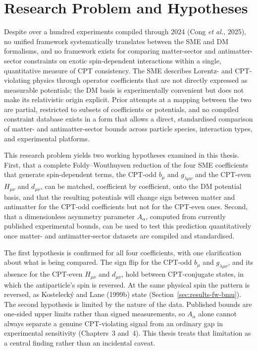 \section{Research Problem and Hypotheses}

Despite over a hundred experiments compiled through 2024 (Cong \textit{et
al.}, 2025), no unified framework systematically translates between the
SME and DM formalisms, and no framework exists for comparing matter-sector
and antimatter-sector constraints on exotic spin-dependent interactions
within a single, quantitative measure of CPT consistency. The SME describes
Lorentz- and CPT-violating physics through operator coefficients that are
not directly expressed as measurable potentials; the DM basis is
experimentally convenient but does not make its relativistic origin
explicit. Prior attempts at a mapping between the two are partial,
restricted to subsets of coefficients or potentials, and no compiled
constraint database exists in a form that allows a direct, standardised
comparison of matter- and antimatter-sector bounds across particle species,
interaction types, and experimental platforms.

This research problem yields two working hypotheses examined in this
thesis. First, that a complete Foldy--Wouthuysen reduction of the four SME
coefficients that generate spin-dependent terms, the CPT-odd $b_\mu$ and
$g_{\lambda\mu\nu}$ and the CPT-even $H_{\mu\nu}$ and $d_{\mu\nu}$, can be
matched, coefficient by coefficient, onto the DM potential basis, and that
the resulting potentials will change sign between matter and antimatter for
the CPT-odd coefficients but not for the CPT-even ones. Second, that a
dimensionless asymmetry parameter $A_\alpha$, computed from currently
published experimental bounds, can be used to test this prediction
quantitatively once matter- and antimatter-sector datasets are compiled
and standardised.

The first hypothesis is confirmed for all four coefficients, with one
clarification about what is being compared. The sign flip for the CPT-odd
$b_\mu$ and $g_{\lambda\mu\nu}$, and its absence for the CPT-even
$H_{\mu\nu}$ and $d_{\mu\nu}$, hold between CPT-conjugate states, in which
the antiparticle's spin is reversed. At the same physical spin the pattern
is reversed, as Kostelecký and Lane (1999b) state
(Section~\ref{sec:results-fw-bmu}). The second
hypothesis is limited by the nature of the data. Published bounds are
one-sided upper limits rather than signed measurements, so $A_\alpha$ alone
cannot always separate a genuine CPT-violating signal from an ordinary gap
in experimental sensitivity (Chapters~3 and~4). This thesis treats that
limitation as a central finding rather than an incidental caveat.

